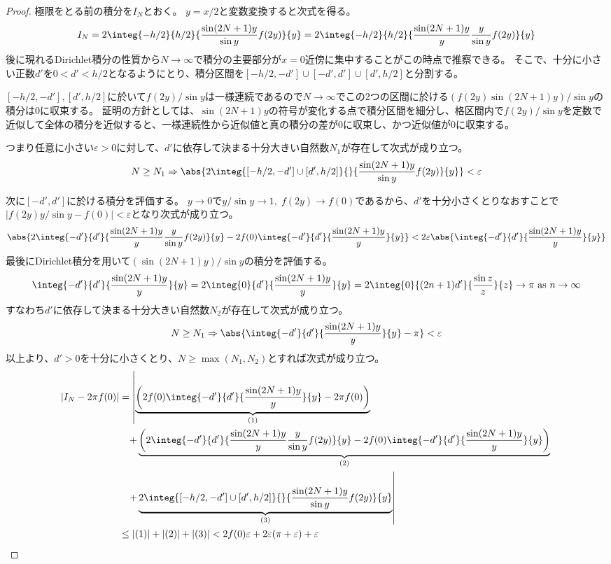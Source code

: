 				\begin{proof}
					\quad\par
					極限をとる前の積分を$I_N$とおく。
					$y = x/2$と変数変換すると次式を得る。
					\[
						I_N = 2\integ{-h/2}{h/2}{\frac{\sin(2N+1)y}{\sin y}f(2y)}{y} = 2\integ{-h/2}{h/2}{\frac{\sin(2N+1)y}{y}\frac{y}{\sin y}f(2y)}{y}
					\]
					後に現れるDirichlet積分の性質から$N\to\infty$で積分の主要部分が$x=0$近傍に集中することがこの時点で推察できる。
					そこで、十分に小さい正数$d'$を$0<d'<h/2$となるようにとり、積分区間を$[-h/2,-d']\cup[-d',d']\cup[d',h/2]$と分割する。
					\par
					$[-h/2,-d'], [d',h/2]$に於いて$f(2y)/\sin y$は一様連続であるので$N\to\infty$でこの2つの区間に於ける$(f(2y)\sin(2N+1)y)/\sin y$の積分は0に収束する。
					証明の方針としては、$\sin(2N+1)y$の符号が変化する点で積分区間を細分し、格区間内で$f(2y)/\sin y$を定数で近似して全体の積分を近似すると、一様連続性から近似値と真の積分の差が0に収束し、かつ近似値が0に収束する。
					\par
					つまり任意に小さい$\varepsilon>0$に対して、$d'$に依存して決まる十分大きい自然数$N_1$が存在して次式が成り立つ。
					\[
						N\geq N_1 \Rightarrow \abs{2\integ{[-h/2,-d']\cup[d',h/2]}{}{\frac{\sin(2N+1)y}{\sin y}f(2y)}{y}}<\varepsilon
					\]
					\par
					次に$[-d',d']$に於ける積分を評価する。
					$y\to 0$で$y/\sin y\to 1,\;f(2y)\to f(0)$であるから、$d'$を十分小さくとりなおすことで$|f(2y)y/\sin y - f(0)| < \varepsilon$となり次式が成り立つ。
					\[
						\abs{2\integ{-d'}{d'}{\frac{\sin(2N+1)y}{y}\frac{y}{\sin y}f(2y)}{y} - 2f(0)\integ{-d'}{d'}{\frac{\sin(2N+1)y}{y}}{y}} < 2\varepsilon\abs{\integ{-d'}{d'}{\frac{\sin(2N+1)y}{y}}{y}}
					\]
					最後にDirichlet積分を用いて$(\sin(2N+1)y)/\sin y$の積分を評価する。
					\[
						\integ{-d'}{d'}{\frac{\sin(2N+1)y}{y}}{y} = 2\integ{0}{d'}{\frac{\sin(2N+1)y}{y}}{y} = 2\integ{0}{(2n+1)d'}{\frac{\sin z}{z}}{z} \to \pi \text{ as } n\to\infty
					\]
					すなわち$d'$に依存して決まる十分大きい自然数$N_2$が存在して次式が成り立つ。
					\[ N\geq N_1 \Rightarrow \abs{\integ{-d'}{d'}{\frac{\sin(2N+1)y}{y}}{y} - \pi} < \varepsilon \]
					以上より、$d'>0$を十分に小さくとり、$N\geq\max(N_1,N_2)$とすれば次式が成り立つ。
					\begin{align*}
						|I_N - 2\pi f(0)| &= \left|\underbrace{\left(2f(0)\integ{-d'}{d'}{\frac{\sin(2N+1)y}{y}}{y} - 2\pi f(0)\right)}_{(1)} \right. \\
						&\phantom{=} \left.+ \underbrace{\left(2\integ{-d'}{d'}{\frac{\sin(2N+1)y}{y}\frac{y}{\sin y}f(2y)}{y} - 2f(0)\integ{-d'}{d'}{\frac{\sin(2N+1)y}{y}}{y}\right)}_{(2)} \right. \\
						&\phantom{=} \left.+ \underbrace{2\integ{[-h/2,-d']\cup[d',h/2]}{}{\frac{\sin(2N+1)y}{\sin y}f(2y)}{y}}_{(3)}\right| \\
						&\leq |(1)| + |(2)| + |(3)| < 2f(0)\varepsilon + 2\varepsilon(\pi+\varepsilon) + \varepsilon
					\end{align*}
				\end{proof}
